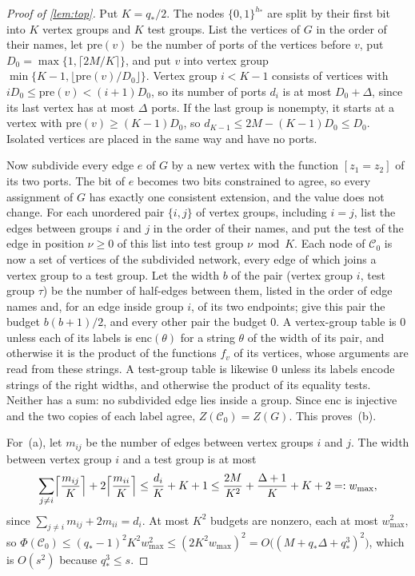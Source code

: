 \documentclass[11pt]{article}
\theoremstyle{definition}
\theoremstyle{definition}
\theoremstyle{remark}
\begin{document}
\begin{proof}[Proof of \cref{lem:top}]
Put $K=q_*/2$. The nodes $\{0,1\}^{h_*}$ are split by their first bit into $K$ vertex groups and $K$ test groups. List the vertices of $G$ in the order of their names, let $\mathrm{pre}(v)$ be the number of ports of the vertices before $v$, put $D_0=\max\{1,\lceil2M/K\rceil\}$, and put $v$ into vertex group $\min\{K-1,\lfloor \mathrm{pre}(v)/D_0\rfloor\}$. Vertex group $i<K-1$ consists of vertices with $iD_0\le \mathrm{pre}(v)<(i+1)D_0$, so its number of ports $d_i$ is at most $D_0+\Delta$, since its last vertex has at most $\Delta$ ports. If the last group is nonempty, it starts at a vertex with $\mathrm{pre}(v)\ge(K-1)D_0$, so $d_{K-1}\le2M-(K-1)D_0\le D_0$. Isolated vertices are placed in the same way and have no ports.

Now subdivide every edge $e$ of $G$ by a new vertex with the function $[z_1=z_2]$ of its two ports. The bit of $e$ becomes two bits constrained to agree, so every assignment of $G$ has exactly one consistent extension, and the value does not change. For each unordered pair $\{i,j\}$ of vertex groups, including $i=j$, list the edges between groups $i$ and $j$ in the order of their names, and put the test of the edge in position $\nu\ge0$ of this list into test group $\nu\bmod K$. Each node of $\mathcal C_0$ is now a set of vertices of the subdivided network, every edge of which joins a vertex group to a test group. Let the width $b$ of the pair (vertex group $i$, test group $\tau$) be the number of half-edges between them, listed in the order of edge names and, for an edge inside group $i$, of its two endpoints; give this pair the budget $b(b+1)/2$, and every other pair the budget $0$. A vertex-group table is $0$ unless each of its labels is $\mathrm{enc}(\theta)$ for a string $\theta$ of the width of its pair, and otherwise it is the product of the functions $f_v$ of its vertices, whose arguments are read from these strings. A test-group table is likewise $0$ unless its labels encode strings of the right widths, and otherwise the product of its equality tests. Neither has a sum: no subdivided edge lies inside a group. Since $\mathrm{enc}$ is injective and the two copies of each label agree, $Z(\mathcal C_0)=Z(G)$. This proves~(b).

For~(a), let $m_{ij}$ be the number of edges between vertex groups $i$ and $j$. The width between vertex group $i$ and a test group is at most
\[
\sum_{j\ne i}\Bigl\lceil\frac{m_{ij}}K\Bigr\rceil+2\Bigl\lceil\frac{m_{ii}}K\Bigr\rceil\le\frac{d_i}K+K+1\le\frac{2M}{K^2}+\frac{\Delta+1}K+K+2=:w_{\max},
\]
since $\sum_{j\ne i}m_{ij}+2m_{ii}=d_i$. At most $K^2$ budgets are nonzero, each at most $w_{\max}^2$, so $\Phi(\mathcal C_0)\le(q_*-1)^2K^2w_{\max}^2\le(2K^2w_{\max})^2=O\bigl((M+q_*\Delta+q_*^3)^2\bigr)$, which is $O(s^2)$ because $q_*^3\le s$.


\end{proof}
\end{document}

